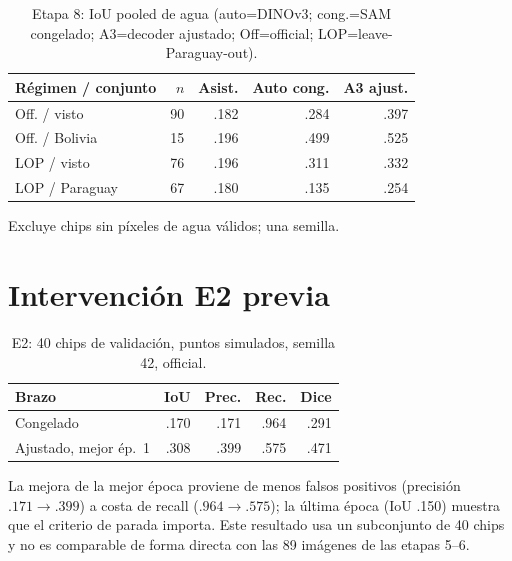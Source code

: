 \documentclass[conference]{IEEEtran}
\begin{document}
\begin{table}[!t]\centering\scriptsize\setlength{\tabcolsep}{2pt}\caption{Etapa 8: IoU pooled de agua (auto=DINOv3; cong.=SAM congelado; A3=decoder ajustado; Off=official; LOP=leave-Paraguay-out).}\label{tab:stage8}
\begin{tabular}{@{}p{1.55cm}rrrr@{}}\toprule
R\'egimen / conjunto & $n$ & Asist. & Auto cong. & A3 ajust.\\\midrule
Off. / visto & 90 & .182 & .284 & .397\\
Off. / Bolivia & 15 & .196 & .499 & .525\\
LOP / visto & 76 & .196 & .311 & .332\\
LOP / Paraguay & 67 & .180 & .135 & .254\\\bottomrule
\end{tabular}\par\vspace{1mm}\begin{minipage}{\columnwidth}\scriptsize Excluye chips sin p\'ixeles de agua v\'alidos; una semilla.\end{minipage}
\end{table}

\section{Intervenci\'on E2 previa}
\begin{table}[!t]\centering\footnotesize\caption{E2: 40 chips de validaci\'on, puntos simulados, semilla 42, official.}
\begin{tabular}{@{}lrrrr@{}}\toprule
Brazo & IoU & Prec. & Rec. & Dice\\\midrule
Congelado & .170 & .171 & .964 & .291\\
Ajustado, mejor \'ep.~1 & .308 & .399 & .575 & .471\\\bottomrule
\end{tabular}\end{table}
La mejora de la mejor \'epoca proviene de menos falsos positivos (precisi\'on $.171\to.399$) a costa de recall ($.964\to.575$); la \'ultima \'epoca (IoU .150) muestra que el criterio de parada importa. Este resultado usa un subconjunto de 40 chips y no es comparable de forma directa con las 89 im\'agenes de las etapas 5--6.
\end{document}
